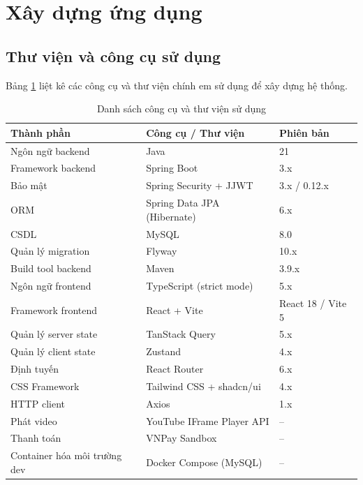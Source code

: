 \documentclass[../DoAn.tex]{subfiles}
\begin{document}
\section{Xây dựng ứng dụng}

\subsection{Thư viện và công cụ sử dụng}
\label{subsection:4.3.1}

Bảng \ref{table:4.1} liệt kê các công cụ và thư viện chính em sử dụng để xây dựng hệ thống.

\begin{table}[H]
\centering
\renewcommand{\arraystretch}{1.2}
\begin{tabular}{p{4.3cm} p{6.2cm} p{3cm}}
\hline
\textbf{Thành phần} & \textbf{Công cụ / Thư viện} & \textbf{Phiên bản} \\ \hline
Ngôn ngữ backend & Java & 21 \\ \hline
Framework backend & Spring Boot & 3.x \\ \hline
Bảo mật & Spring Security + JJWT & 3.x / 0.12.x \\ \hline
ORM & Spring Data JPA (Hibernate) & 6.x \\ \hline
CSDL & MySQL & 8.0 \\ \hline
Quản lý migration & Flyway & 10.x \\ \hline
Build tool backend & Maven & 3.9.x \\ \hline
Ngôn ngữ frontend & TypeScript (strict mode) & 5.x \\ \hline
Framework frontend & React + Vite & React 18 / Vite 5 \\ \hline
Quản lý server state & TanStack Query & 5.x \\ \hline
Quản lý client state & Zustand & 4.x \\ \hline
Định tuyến & React Router & 6.x \\ \hline
CSS Framework & Tailwind CSS + shadcn/ui & 4.x \\ \hline
HTTP client & Axios & 1.x \\ \hline
Phát video & YouTube IFrame Player API & -- \\ \hline
Thanh toán & VNPay Sandbox & -- \\ \hline
Container hóa môi trường dev & Docker Compose (MySQL) & -- \\ \hline
\end{tabular}
\renewcommand{\arraystretch}{1}
\caption{Danh sách công cụ và thư viện sử dụng}
\label{table:4.1}
\end{table}
\end{document}

